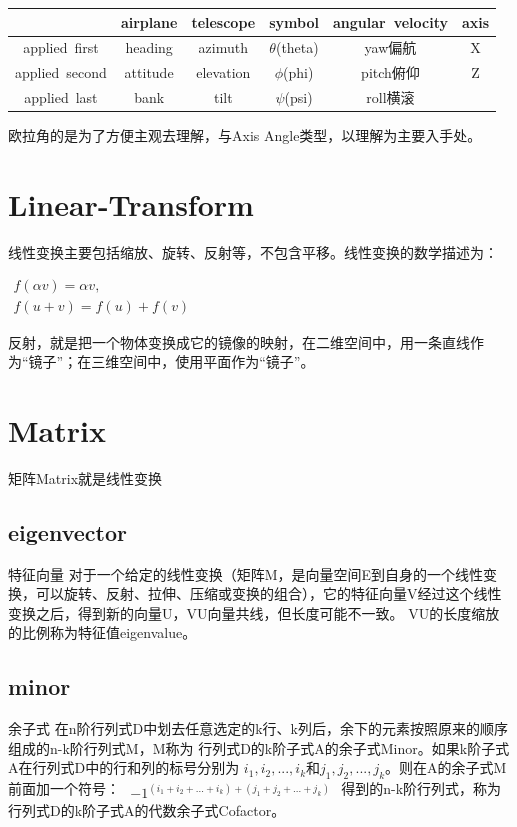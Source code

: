 \begin{tabular}{|c|c|c|c|c|c|}
    \hline
  & airplane & telescope & symbol & \hbox{angular velocity} & axis \\ \hline
 \hbox{applied first} & heading & azimuth & \hbox{$\theta$(theta)} & \hbox{yaw偏航} & X \\ \hline
 \hbox{applied second} & attitude & elevation & \hbox{$\phi$(phi)} & \hbox{pitch俯仰} & Z \\ \hline
 \hbox{applied last} & bank & tilt & \hbox{$\psi$(psi)} & \hbox{roll横滚} \\ \hline
\end{tabular}
 
 欧拉角的是为了方便主观去理解，与Axis Angle类型，以理解为主要入手处。

 
 \section{Linear-Transform}

线性变换主要包括缩放、旋转、反射等，不包含平移。线性变换的数学描述为：

\begin{math}
\begin{aligned}
f(\alpha v)=\alpha v, \\
f(u+v)=f(u)+f(v)
\end{aligned}
\end{math}

反射，就是把一个物体变换成它的镜像的映射，在二维空间中，用一条直线作为“镜子”；在三维空间中，使用平面作为“镜子”。


\section{ Matrix }

矩阵Matrix就是线性变换

\subsection{eigenvector}
特征向量
对于一个给定的线性变换（矩阵M，是向量空间E到自身的一个线性变换，可以旋转、反射、拉伸、压缩或变换的组合），它的特征向量V经过这个线性变换之后，得到新的向量U，VU向量共线，但长度可能不一致。
VU的长度缩放的比例称为特征值eigenvalue。

\subsection{minor}
余子式
在n阶行列式D中划去任意选定的k行、k列后，余下的元素按照原来的顺序组成的n-k阶行列式M，M称为
行列式D的k阶子式A的余子式Minor。如果k阶子式A在行列式D中的行和列的标号分别为
$i_{1},i_{2},...,i_{k}$和$j_{1},j_{2},...,j_{k}$。则在A的余子式M前面加一个符号：
\begin{math}
    \begin{aligned}
        {-1}^{(i_{1}+i_{2}+...+i_{k}) + (j_{1}+j_{2}+...+j_{k})}
    \end{aligned}
\end{math}
得到的n-k阶行列式，称为行列式D的k阶子式A的代数余子式Cofactor。

